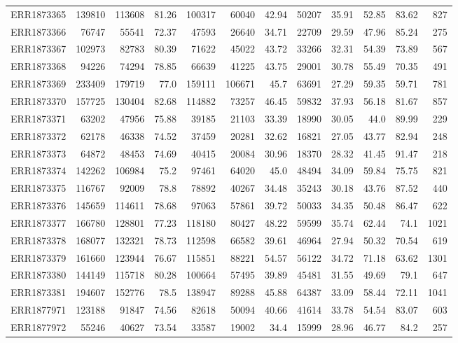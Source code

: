 \documentclass[12pt, oneside]{report}
\begin{document}
\begin{longtable}{@{}p{3.2cm}rrrrrrrrrrr@{}}
ERR1873365 & 139810 & 113608 & 81.26 & 100317 & 60040 & 42.94 & 50207 & 35.91 & 52.85 & 83.62 & 827 \\
ERR1873366 & 76747 & 55541 & 72.37 & 47593 & 26640 & 34.71 & 22709 & 29.59 & 47.96 & 85.24 & 275 \\
ERR1873367 & 102973 & 82783 & 80.39 & 71622 & 45022 & 43.72 & 33266 & 32.31 & 54.39 & 73.89 & 567 \\
ERR1873368 & 94226 & 74294 & 78.85 & 66639 & 41225 & 43.75 & 29001 & 30.78 & 55.49 & 70.35 & 491 \\
ERR1873369 & 233409 & 179719 & 77.0 & 159111 & 106671 & 45.7 & 63691 & 27.29 & 59.35 & 59.71 & 781 \\
ERR1873370 & 157725 & 130404 & 82.68 & 114882 & 73257 & 46.45 & 59832 & 37.93 & 56.18 & 81.67 & 857 \\
ERR1873371 & 63202 & 47956 & 75.88 & 39185 & 21103 & 33.39 & 18990 & 30.05 & 44.0 & 89.99 & 229 \\
ERR1873372 & 62178 & 46338 & 74.52 & 37459 & 20281 & 32.62 & 16821 & 27.05 & 43.77 & 82.94 & 248 \\
ERR1873373 & 64872 & 48453 & 74.69 & 40415 & 20084 & 30.96 & 18370 & 28.32 & 41.45 & 91.47 & 218 \\
ERR1873374 & 142262 & 106984 & 75.2 & 97461 & 64020 & 45.0 & 48494 & 34.09 & 59.84 & 75.75 & 821 \\
ERR1873375 & 116767 & 92009 & 78.8 & 78892 & 40267 & 34.48 & 35243 & 30.18 & 43.76 & 87.52 & 440 \\
ERR1873376 & 145659 & 114611 & 78.68 & 97063 & 57861 & 39.72 & 50033 & 34.35 & 50.48 & 86.47 & 622 \\
ERR1873377 & 166780 & 128801 & 77.23 & 118180 & 80427 & 48.22 & 59599 & 35.74 & 62.44 & 74.1 & 1021 \\
ERR1873378 & 168077 & 132321 & 78.73 & 112598 & 66582 & 39.61 & 46964 & 27.94 & 50.32 & 70.54 & 619 \\
ERR1873379 & 161660 & 123944 & 76.67 & 115851 & 88221 & 54.57 & 56122 & 34.72 & 71.18 & 63.62 & 1301 \\
ERR1873380 & 144149 & 115718 & 80.28 & 100664 & 57495 & 39.89 & 45481 & 31.55 & 49.69 & 79.1 & 647 \\
ERR1873381 & 194607 & 152776 & 78.5 & 138947 & 89288 & 45.88 & 64387 & 33.09 & 58.44 & 72.11 & 1041 \\
ERR1877971 & 123188 & 91847 & 74.56 & 82618 & 50094 & 40.66 & 41614 & 33.78 & 54.54 & 83.07 & 603 \\
ERR1877972 & 55246 & 40627 & 73.54 & 33587 & 19002 & 34.4 & 15999 & 28.96 & 46.77 & 84.2 & 257 \\

\end{longtable}
\end{document}
